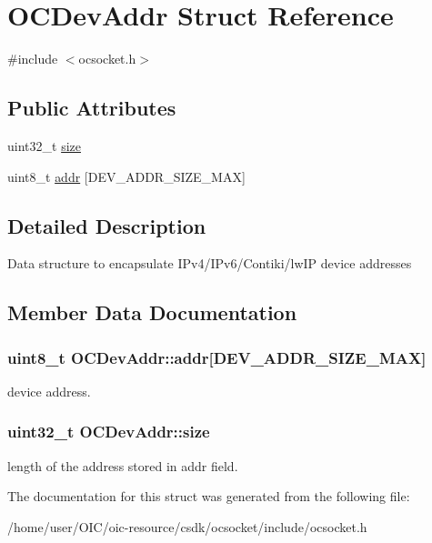 \hypertarget{structOCDevAddr}{}\section{O\+C\+Dev\+Addr Struct Reference}
\label{structOCDevAddr}


{\ttfamily \#include $<$ocsocket.\+h$>$}

\subsection*{Public Attributes}
\begin{DoxyCompactItemize}
\item 
uint32\+\_\+t \hyperlink{structOCDevAddr_a491e796c83923aacb93ac5bc8c31325c}{size}
\item 
uint8\+\_\+t \hyperlink{structOCDevAddr_a8d1419ae05d56b162333fdcbac9a6f31}{addr} \mbox{[}D\+E\+V\+\_\+\+A\+D\+D\+R\+\_\+\+S\+I\+Z\+E\+\_\+\+M\+A\+X\mbox{]}
\end{DoxyCompactItemize}


\subsection{Detailed Description}
Data structure to encapsulate I\+Pv4/\+I\+Pv6/\+Contiki/lw\+I\+P device addresses 

\subsection{Member Data Documentation}
\hypertarget{structOCDevAddr_a8d1419ae05d56b162333fdcbac9a6f31}{}
\subsubsection[{addr}]{\setlength{\rightskip}{0pt plus 5cm}uint8\+\_\+t O\+C\+Dev\+Addr\+::addr\mbox{[}D\+E\+V\+\_\+\+A\+D\+D\+R\+\_\+\+S\+I\+Z\+E\+\_\+\+M\+A\+X\mbox{]}}\label{structOCDevAddr_a8d1419ae05d56b162333fdcbac9a6f31}
device address. \hypertarget{structOCDevAddr_a491e796c83923aacb93ac5bc8c31325c}{}
\subsubsection[{size}]{\setlength{\rightskip}{0pt plus 5cm}uint32\+\_\+t O\+C\+Dev\+Addr\+::size}\label{structOCDevAddr_a491e796c83923aacb93ac5bc8c31325c}
length of the address stored in addr field. 

The documentation for this struct was generated from the following file\+:\begin{DoxyCompactItemize}
\item 
/home/user/\+O\+I\+C/oic-\/resource/csdk/ocsocket/include/ocsocket.\+h\end{DoxyCompactItemize}
